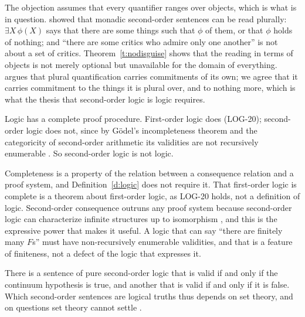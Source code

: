 \documentclass{situationist-preprint}
\begin{document}
\begin{reply}
The objection assumes that every quantifier ranges over objects, which is what is in question. \citet{Boolos1984} showed that monadic second-order sentences can be read plurally: $\exists X\, \phi(X)$ says that there are some things such that $\phi$ of them, or that $\phi$ holds of nothing; and \enquote{there are some critics who admire only one another} is not about a set of critics. Theorem~\ref{t:nodisguise} shows that the reading in terms of objects is not merely optional but unavailable for the domain of everything. \citet{Linnebo2003} argues that plural quantification carries commitments of its own; we agree that it carries commitment to the things it is plural over, and to nothing more, which is what the thesis that second-order logic is logic requires.
\end{reply}

\begin{objection}[Incompleteness]
Logic has a complete proof procedure. First-order logic does (LOG-20); second-order logic does not, since by G\"odel's incompleteness theorem and the categoricity of second-order arithmetic its validities are not recursively enumerable \citep{Godel1931}. So second-order logic is not logic.
\end{objection}

\begin{reply}
Completeness is a property of the relation between a consequence relation and a proof system, and Definition~\ref{d:logic} does not require it. That first-order logic is complete is a theorem about first-order logic, as LOG-20 holds, not a definition of logic. Second-order consequence outruns any proof system because second-order logic can characterize infinite structures up to isomorphism \citep{Dedekind1888,Shapiro1991}, and this is the expressive power that makes it useful. A logic that can say \enquote{there are finitely many $F$s} must have non-recursively enumerable validities, and that is a feature of finiteness, not a defect of the logic that expresses it.
\end{reply}

\begin{objection}[Entanglement]
There is a sentence of pure second-order logic that is valid if and only if the continuum hypothesis is true, and another that is valid if and only if it is false. Which second-order sentences are logical truths thus depends on set theory, and on questions set theory cannot settle \citep{Jane1993,Vaananen2001}.
\end{objection}
\end{document}
